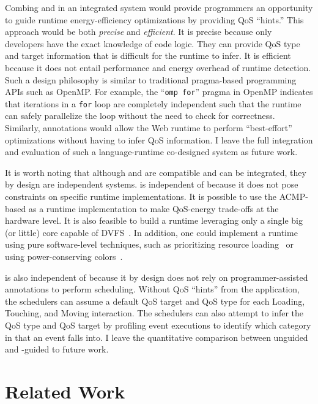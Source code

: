 Combing \greenweb and \webrt in an integrated system would provide programmers an opportunity to guide runtime energy-efficiency optimizations by providing QoS ``hints.'' This approach would be both \textit{precise} and \textit{efficient}. It is precise because only developers have the exact knowledge of code logic. They can provide QoS type and target information that is difficult for the runtime to infer. It is efficient because it does not entail performance and energy overhead of runtime detection. Such a design philosophy is similar to traditional pragma-based programming APIs such as OpenMP. For example, the ``\texttt{omp for}'' pragma in OpenMP indicates that iterations in a \texttt{for} loop are completely independent such that the runtime can safely parallelize the loop without the need to check for correctness. Similarly, \greenweb annotations would allow the Web runtime to perform ``best-effort'' optimizations without having to infer QoS information. I leave the full integration and evaluation of such a language-runtime co-designed system as future work.

It is worth noting that although \greenweb and \webrt are compatible and can be integrated, they by design are independent systems. \greenweb is independent of \webrt because it does not pose constraints on specific runtime implementations. It is possible to use the ACMP-based \webrt as a \greenweb runtime implementation to make QoS-energy trade-offs at the hardware level. It is also feasible to build a runtime leveraging only a single big (or little) core capable of DVFS~\cite{pgdvfs,vsmp}. In addition, one could implement a \greenweb runtime using pure software-level techniques, such as prioritizing resource loading~\cite{klotski} or using power-conserving colors~\cite{chameleon}. 

\webrt is also independent of \greenweb because it by design does not rely on programmer-assisted annotations to perform scheduling. Without QoS ``hints'' from the application, the \webrt schedulers can assume a default QoS target and QoS type for each Loading, Touching, and Moving interaction. The \webrt schedulers can also attempt to infer the QoS type and QoS target by profiling event executions to identify which category in  that an event falls into. I leave the quantitative comparison between unguided and \greenweb-guided \webrt to future work.

\section{Related Work}
\label{sec:lang:related}

